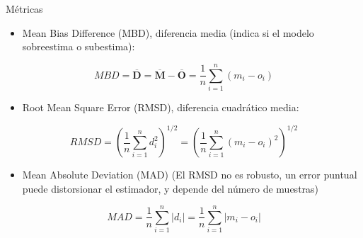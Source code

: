 \documentclass[xcolor={usenames,svgnames,dvipsnames}]{beamer}
\begin{document}
\begin{frame}[label={sec:orgc116573}]{Métricas}
\begin{itemize}
\item Mean Bias Difference (MBD), diferencia media (indica si el modelo sobreestima o subestima):
\end{itemize}
\[
MBD = \overline{\mathbf{D}} = \overline{\mathbf{M}} - \overline{\mathbf{O}} = \frac{1}{n} \sum_{i=1}^n (m_i - o_i)
\]

\begin{itemize}
\item Root Mean Square Error (RMSD), diferencia cuadrático media:
\end{itemize}
\[
RMSD = \left(\frac{1}{n} \sum_{i=1}^n d_i^2 \right)^{1/2} =  \left( \frac{1}{n} \sum_{i=1}^n (m_i - o_i)^2  \right)^{1/2}
\]

\begin{itemize}
\item Mean Absolute Deviation (MAD) (El RMSD no es robusto, un error puntual puede distorsionar el estimador, y depende del número de muestras)
\end{itemize}

\[
MAD = \frac{1}{n} \sum_{i=1}^n \left|d_i\right| =  \frac{1}{n} \sum_{i=1}^n \left|m_i - o_i\right|
\]
\end{frame}
\end{document}
